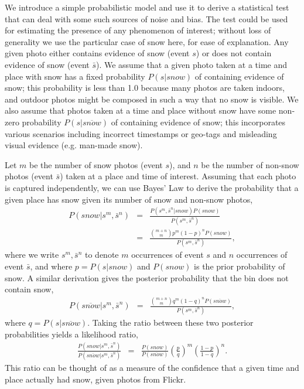   We introduce a simple probabilistic model
and use it to derive a statistical test that can deal with some such
sources of noise and bias. The test could be used for estimating the
presence of any phenomenon of interest; without loss of generality we
use the particular case of snow here, for ease of explanation.  Any
given photo either contains evidence of snow (event $s$) or does not
contain evidence of snow (event $\bar{s}$).  We assume that a given
photo taken at a time and place with snow has a fixed probability $P(s
| snow)$ of containing evidence of snow; this probability is less than
1.0 because many photos are taken indoors, and outdoor photos might be
composed in such a way that no snow is visible. We also assume that
photos taken at a time and place without snow have some non-zero
probability $P(s | \overline{snow})$ of containing evidence of snow;
this incorporates various scenarios including incorrect timestamps or
geo-tags and misleading visual evidence (e.g.  man-made
snow).

Let $m$ be the number of snow
photos (event $s$), and $n$ be the number of non-snow photos (event
$\bar{s}$) taken at a place and time of interest. Assuming that each photo is captured
independently, we can use Bayes' Law to
derive the probability that a given place has snow
given its number of snow and non-snow photos,
%
\newcommand{\smsn}{s^m, \bar{s}^n}
\newcommand{\smsntwo}{s^m, \bar{s}^n}
\begin{eqnarray*}
P(snow|\smsn)  &=&\frac{ P(\smsn|snow)P(snow)}{P(\smsntwo)}  \\
&=&\frac{{m+n\choose m}p^{m}(1-p)^{n}P(snow)}{P(\smsntwo)},  
\end{eqnarray*}
%
where we write $s^m, \bar{s}^n$ to denote $m$ occurrences of event $s$ and $n$ occurrences of event $\bar{s}$, and where $p=P(s|snow)$ and $P(snow)$ is the prior probability of snow. A similar derivation gives the posterior probability that the bin does not contain snow,
%
\begin{eqnarray*}
P(\overline{snow}|\smsn)  &=&\frac{{m+n\choose m}q^{m}(1-q)^{n}P(\overline{snow})}{P(\smsntwo)},  
\end{eqnarray*}
%
where $q=P(s|\overline{snow})$. 
%
Taking the ratio between these two posterior probabilities yields a likelihood ratio,
%
\begin{eqnarray}
\frac{P(snow|\smsn)}{P(\overline{snow}|\smsntwo)}
&=&\frac{P(snow)}{P(\overline{snow})}\left(\frac{p}{q}\right)^{m}\left(\frac{1-p}{1-q}\right)^n.
\label{eq:conf}
\end{eqnarray}
%
This ratio can be thought of as a measure of the confidence that a
given time and place actually had snow, given photos from Flickr.

